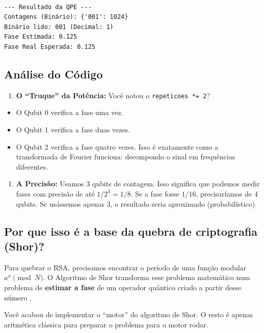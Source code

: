 \documentclass[
  brazilian,
]{report}
\providecommand{\tightlist}{%
  \setlength{\itemsep}{0pt}\setlength{\parskip}{0pt}}
\begin{document}
\begin{verbatim}

--- Resultado da QPE ---
Contagens (Binário): {'001': 1024}
Binário lido: 001 (Decimal: 1)
Fase Estimada: 0.125
Fase Real Esperada: 0.125
\end{verbatim}

\subsection{Análise do Código}\label{anuxe1lise-do-cuxf3digo}

\begin{enumerate}
\def\labelenumi{\arabic{enumi}.}
\tightlist
\item
  \textbf{O ``Truque'' da Potência:} Você notou o
  \texttt{repeticoes\ *=\ 2}?
\end{enumerate}

\begin{itemize}
\tightlist
\item
  O Qubit 0 verifica a fase uma vez.
\item
  O Qubit 1 verifica a fase duas vezes.
\item
  O Qubit 2 verifica a fase quatro vezes. Isso é exatamente como a
  transformada de Fourier funciona: decompondo o sinal em frequências
  diferentes.
\end{itemize}

\begin{enumerate}
\def\labelenumi{\arabic{enumi}.}
\setcounter{enumi}{1}
\tightlist
\item
  \textbf{A Precisão:} Usamos 3 qubits de contagem. Isso significa que
  podemos medir fases com precisão de até \(1/2^3 = 1/8\). Se a fase
  fosse \(1/16\), precisaríamos de 4 qubits. Se usássemos apenas 3, o
  resultado seria aproximado (probabilístico).
\end{enumerate}

\subsection{Por que isso é a base da quebra de criptografia
(Shor)?}\label{por-que-isso-uxe9-a-base-da-quebra-de-criptografia-shor}

Para quebrar o RSA, precisamos encontrar o período de uma função modular
\(a^x \pmod N\). O Algoritmo de Shor transforma esse problema matemático
num problema de \textbf{estimar a fase} de um operador quântico criado a
partir desse número .

Você acabou de implementar o ``motor'' do algoritmo de Shor. O resto é
apenas aritmética clássica para preparar o problema para o motor rodar.
\end{document}
